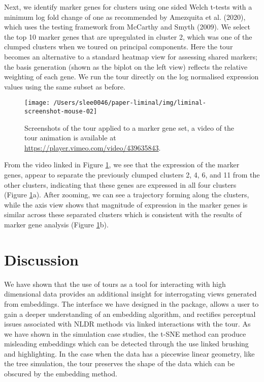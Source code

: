 \documentclass[article,notitle]{jdssv}
\begin{document}
Next, we identify marker genes for clusters using one sided Welch t-tests with
a minimum log fold change of one as recommended by Amezquita et al. (2020), which
uses the testing framework from McCarthy and Smyth (2009). We select the top 10 marker
genes that are upregulated in cluster 2, which was one of the clumped clusters
when we toured on principal components. Here the tour becomes an alternative
to a standard heatmap view for assessing shared markers; the basis
generation (shown as the biplot on the left view) reflects the relative
weighting of each gene. We run the tour directly on the
log normalised expression values using the same subset as before.



\begin{figure}

{\centering \texttt{[image: /Users/slee0046/paper-liminal/img/liminal-screenshot-mouse-02]} 

}

\caption{Screenshots of the  tour applied to a marker gene set, a video of the tour animation is available at \url{https://player.vimeo.com/video/439635843}.}\label{fig:mouse-02}
\end{figure}

From the video linked in Figure \ref{fig:mouse-02}, we see that the
expression of the marker genes, appear to separate
the previously clumped clusters 2, 4, 6, and 11 from the other clusters,
indicating that these genes are expressed in all four clusters (Figure \ref{fig:mouse-02}a). After zooming, we can see a trajectory forming along
the clusters, while the axis view shows that magnitude of expression in
the marker genes is similar across these separated clusters which is
consistent with the results of marker gene analysis (Figure \ref{fig:mouse-02}b).

\hypertarget{discussion}{%
\section{Discussion}\label{discussion}}

We have shown that the use of tours as a tool for interacting with
high dimensional data provides an additional insight for interrogating views
generated from embeddings. The interface we have designed in the 
package, allows a user to gain a deeper understanding of an embedding
algorithm, and rectifies perceptual issues associated with NLDR methods via
linked interactions with the tour. As we have shown in the simulation case
studies, the t-SNE method can produce misleading embeddings which can be
detected through the use linked brushing and highlighting. In the case when
the data has a piecewise linear geometry, like the tree simulation, the tour
preserves the shape of the data which can be obscured by the embedding method.
\end{document}
